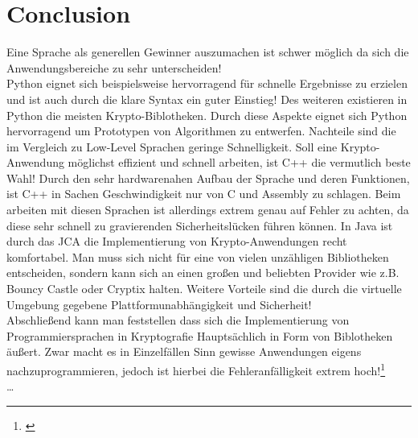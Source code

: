\documentclass[a4paper,12pt]{scrartcl}
\begin{document}
\section{Conclusion}
Eine Sprache als generellen Gewinner auszumachen ist schwer möglich da sich die Anwendungsbereiche zu sehr unterscheiden!\\
Python eignet sich beispielsweise hervorragend für schnelle Ergebnisse zu erzielen und ist auch durch die klare Syntax ein guter Einstieg! Des weiteren existieren in Python die meisten Krypto-Biblotheken. Durch diese Aspekte eignet sich Python hervorragend um Prototypen von Algorithmen zu entwerfen. Nachteile sind die im Vergleich zu Low-Level Sprachen geringe Schnelligkeit. Soll eine Krypto-Anwendung möglichst effizient und schnell arbeiten, ist C++ die vermutlich beste Wahl! Durch den sehr hardwarenahen Aufbau der Sprache und deren Funktionen, ist C++ in Sachen Geschwindigkeit nur von C und Assembly zu schlagen. Beim arbeiten mit diesen Sprachen ist allerdings extrem
genau auf Fehler zu achten, da diese sehr schnell zu gravierenden Sicherheitslücken führen
können.
In Java ist durch das JCA die Implementierung von Krypto-Anwendungen recht komfortabel. Man muss sich nicht für eine von vielen
unzähligen Bibliotheken entscheiden, sondern kann sich an einen großen und beliebten Provider wie z.B. Bouncy Castle oder Cryptix halten. Weitere Vorteile sind die durch die virtuelle Umgebung gegebene
Plattformunabhängigkeit und Sicherheit!\\
Abschließend kann man feststellen dass sich die Implementierung von Programmiersprachen in Kryptografie Hauptsächlich in Form von Biblotheken äußert. Zwar macht es in Einzelfällen Sinn gewisse Anwendungen eigens nachzuprogrammieren, jedoch ist hierbei die Fehleranfälligkeit extrem hoch!\footnote{\cite{876288}}\\
\dots


\newpage
\end{document}
